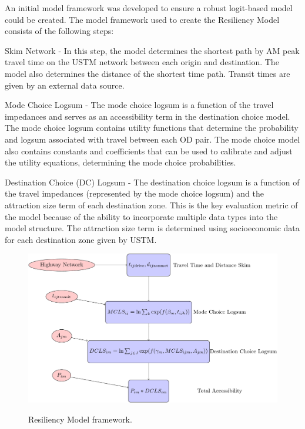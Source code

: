 An initial model framework was developed to ensure a robust logit-based model
could be created. The model framework used to create the Resiliency Model
consists of the following steps:

\begin{description}
	\item {Skim Network} - In this step, the model determines the shortest
  path by AM peak travel time on the USTM network between each origin and
  destination. The model also determines the distance of the shortest time
  path. Transit times are given by an external data source.
	\item {Mode Choice Logsum} - The mode choice logsum is a function of
  the travel impedances and serves as an accessibility term in the destination
  choice model. The mode choice logsum contains utility functions that
  determine the probability and logsum associated with travel between each OD
  pair. The mode choice model also contains constants and coefficients that can
  be used to calibrate and adjust the utility equations, determining the mode
  choice probabilities.
	\item {Destination Choice (DC) Logsum} - The destination choice logsum
  is a function of the travel impedances (represented by the mode choice logsum)
  and the attraction size term of each destination zone. This is the key
  evaluation metric of the model because of the ability to incorporate multiple
  data types into the model structure. The attraction size term is determined
  using socioeconomic data for each destination zone given by USTM.
\end{description}

  \begin{figure}
    \centering
  {\includegraphics[width=0.75\linewidth]{figures/chapter3/framework.png}}
  \caption{Resiliency Model framework.}\label{fig:framework}

  \end{figure}

